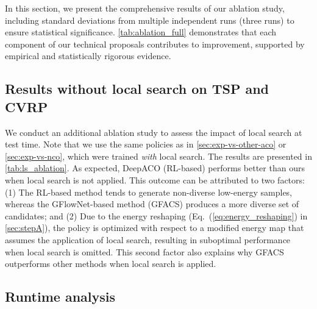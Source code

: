 \documentclass[twoside]{article}
\theoremstyle{plain}
\theoremstyle{definition}
\theoremstyle{remark}
\begin{document}
In this section, we present the comprehensive results of our ablation study, including standard deviations from multiple independent runs (three runs) to ensure statistical significance. \cref{tab:ablation_full} demonstrates that each component of our technical proposals contributes to improvement, supported by empirical and statistically rigorous evidence. 


\subsection{Results without local search on TSP and CVRP}

\begin{table}[ht]
    \centering
    \caption{Results obtained with and without local search (LS) at test time on TSP and CVRP are reported. The values represent the objective value averaged over 128 test instances and further averaged across three independent runs.}
    \vspace{-5pt}
    \resizebox{0.55\linewidth}{!}{}
    \label{tab:ls_ablation}
    \vspace{0pt}
\end{table}

We conduct an additional ablation study to assess the impact of local search at test time. Note that we use the same policies as in \cref{sec:exp-vs-other-aco} or \cref{sec:exp-vs-nco}, which were trained \textit{with} local search. The results are presented in \cref{tab:ls_ablation}. As expected, DeepACO (RL-based) performs better than ours when local search is not applied. This outcome can be attributed to two factors: (1) The RL-based method tends to generate non-diverse low-energy samples, whereas the GFlowNet-based method (GFACS) produces a more diverse set of candidates; and (2) Due to the energy reshaping (Eq.~(\ref{eq:energy_reshaping}) in \cref{sec:stepA}), the policy is optimized with respect to a modified energy map that assumes the application of local search, resulting in suboptimal performance when local search is omitted. This second factor also explains why GFACS outperforms other methods when local search is applied.


\subsection{Runtime analysis}

\begin{table}[ht]
    \centering
    \caption{Average running time (in seconds) to solve a single instance for~\cref{tab:lib}.}
    \vspace{-5pt}
    \resizebox{0.4\linewidth}{!}{}
    \label{tab:lib_time}
    \vspace{0pt}
\end{table}
\end{document}

